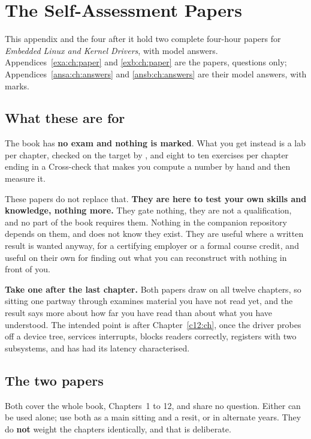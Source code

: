 
\chapter{The Self-Assessment Papers}
\label{exam:ch:about}

This appendix and the four after it hold two complete four-hour papers for \emph{Embedded Linux and
Kernel Drivers}, with model answers. Appendices~\ref{exa:ch:paper} and \ref{exb:ch:paper} are the
papers, questions only; Appendices~\ref{ansa:ch:answers} and \ref{ansb:ch:answers} are their model
answers, with marks.

\section*{What these are for}
The book has \textbf{no exam and nothing is marked}. What you get instead is a lab per chapter,
checked on the target by , and eight to ten exercises per chapter ending in a
Cross-check that makes you compute a number by hand and then measure it.

These papers do not replace that. \textbf{They are here to test your own skills and knowledge,
nothing more.} They gate nothing, they are not a qualification, and no part of the book requires
them. Nothing in the companion repository depends on them, and  does not know they
exist. They are useful where a written result is wanted anyway, for a certifying employer or a
formal course credit, and useful on their own for finding out what you can reconstruct with nothing
in front of you.

\textbf{Take one after the last chapter.} Both papers draw on all twelve chapters, so sitting one
partway through examines material you have not read yet, and the result says more about how far you
have read than about what you have understood. The intended point is after Chapter~\ref{c12:ch},
once the driver probes off a device tree, services interrupts, blocks readers correctly, registers
with two subsystems, and has had its latency characterised.

\section*{The two papers}
Both cover the whole book, Chapters~1 to 12, and share no question. Either can be used alone; use
both as a main sitting and a resit, or in alternate years. They do \textbf{not} weight the chapters
identically, and that is deliberate.

